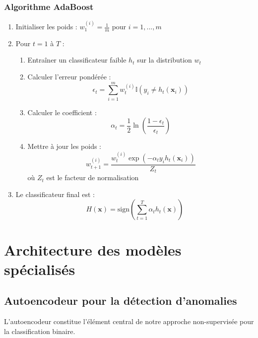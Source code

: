 \subsubsection{Algorithme AdaBoost}
\begin{enumerate}
    \item Initialiser les poids : $w_1^{(i)} = \frac{1}{m}$ pour $i = 1, ..., m$
    \item Pour $t = 1$ à $T$ :
    \begin{enumerate}
        \item Entraîner un classificateur faible $h_t$ sur la distribution $w_t$
        \item Calculer l'erreur pondérée :
        \begin{equation}
            \epsilon_t = \sum_{i=1}^{m} w_t^{(i)} \mathbb{I}(y_i \neq h_t(\mathbf{x}_i))
        \end{equation}
        \item Calculer le coefficient :
        \begin{equation}
            \alpha_t = \frac{1}{2}\ln\left(\frac{1-\epsilon_t}{\epsilon_t}\right)
        \end{equation}
        \item Mettre à jour les poids :
        \begin{equation}
            w_{t+1}^{(i)} = \frac{w_t^{(i)} \exp(-\alpha_t y_i h_t(\mathbf{x}_i))}{Z_t}
        \end{equation}
        où $Z_t$ est le facteur de normalisation
    \end{enumerate}
    \item Le classificateur final est :
    \begin{equation}
        H(\mathbf{x}) = \text{sign}\left(\sum_{t=1}^{T} \alpha_t h_t(\mathbf{x})\right)
    \end{equation}
\end{enumerate}

\section{Architecture des modèles spécialisés}

\subsection{Autoencodeur pour la détection d'anomalies}

L'autoencodeur constitue l'élément central de notre approche non-supervisée pour la classification binaire.

